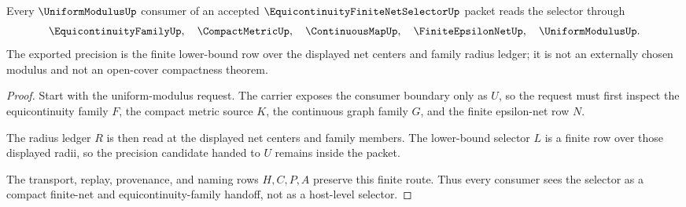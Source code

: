 \begin{theorem}
\label{thm:equicontinuity-finite-net-selector-uniform-modulus-handoff}
Every $\UniformModulusUp$ consumer of an accepted $\EquicontinuityFiniteNetSelectorUp$ packet reads the selector through
$$
\EquicontinuityFamilyUp,\quad \CompactMetricUp,\quad \ContinuousMapUp,\quad \FiniteEpsilonNetUp,\quad \UniformModulusUp .
$$
The exported precision is the finite lower-bound row over the displayed net centers and family radius ledger; it is not an externally chosen modulus and not an open-cover compactness theorem.
\end{theorem}
\begin{proof}
Start with the uniform-modulus request. The carrier exposes the consumer boundary only as $U$, so the request must first inspect the equicontinuity family $F$, the compact metric source $K$, the continuous graph family $G$, and the finite epsilon-net row $N$.

The radius ledger $R$ is then read at the displayed net centers and family members. The lower-bound selector $L$ is a finite row over those displayed radii, so the precision candidate handed to $U$ remains inside the packet.

The transport, replay, provenance, and naming rows $H,C,P,A$ preserve this finite route. Thus every consumer sees the selector as a compact finite-net and equicontinuity-family handoff, not as a host-level selector.
\end{proof}





